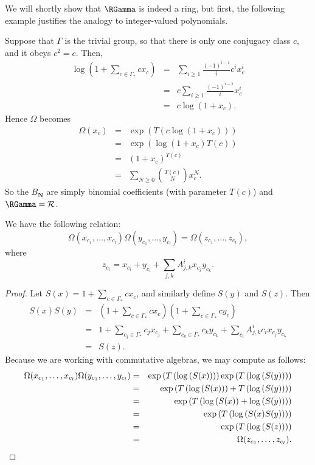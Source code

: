 We will shortly show that $\RGamma$ is indeed a ring, but first, the following example justifies the analogy to integer-valued polynomials.
\begin{example} \label{trivial_rg_example}
Suppose that $\Gamma$ is the trivial group, so that there is only one conjugacy class $c$, and it obeys $c^2 = c$. Then,
\begin{eqnarray*}
\log\left(1 + \sum_{c \in \Gamma_*} c x_c\right) &=& 
\sum_{i\geq 1} \frac{(-1)^{i-1}}{i} c^i x_c^i \\
&=& c \sum_{i\geq 1} \frac{(-1)^{i-1}}{i} x_c^i \\
&=& c \log(1+x_c).
\end{eqnarray*}
Hence $\Omega$ becomes
\begin{eqnarray*}
\Omega(x_{c}) &=& \exp(T(c \log(1+x_c))) \\
&=& \exp(\log(1+x_c) T(c)) \\
&=& (1+x_c)^{T(c)} \\
&=& \sum_{N \geq 0} \binom{T(c)}{N} x_c^N.
\end{eqnarray*}
So the $B_{\mathbf{N}}$ are simply binomial coefficients (with parameter $T(c)$) and $\RGamma = \mathcal{R}$.
\end{example}

\begin{proposition} \label{theta_product_prop}
We have the following relation:
\[
\Omega(x_{c_1}, \ldots, x_{c_l}) \Omega(y_{c_1}, \ldots, y_{c_l}) = \Omega(z_{c_1}, \ldots, z_{c_l}),
\]
where
\[
z_{c_i} = x_{c_i} + y_{c_i} + \sum_{j,k}A_{j,k}^{i}x_{c_j} y_{c_k}.
\]
\end{proposition}
\begin{proof}
Let $S(x) = 1 + \sum_{c \in \Gamma_*} c x_c$, and similarly define $S(y)$ and $S(z)$. Then
\begin{eqnarray*}
S(x)S(y) &=& \left(1 + \sum_{c \in \Gamma_*} c x_c\right)\left(1 + \sum_{c \in \Gamma_*} c y_c\right) \\
&=& 1 + \sum_{c_j \in \Gamma_*} c_j x_{c_j} + \sum_{c_k \in \Gamma_*} c_k y_{c_k} + \sum_{c_i} A_{j,k}^i c_i x_{c_j}y_{c_k} \\
&=& S(z).
\end{eqnarray*}
Because we are working with commutative algebras, we may compute as follows:
\begin{eqnarray*}
\Omega(x_{c_1}, \ldots, x_{c_l}) \Omega(y_{c_1}, \ldots, y_{c_l})
&=& \exp\left(T\left(\log\left(S(x)\right)\right)\right) \exp\left(T\left(\log\left(S(y)\right)\right)\right) \\
&=& \exp\left(T\left(\log\left(S(x)\right)\right) + T\left(\log\left(S(y)\right)\right)\right) \\
&=&\exp\left(T\left(\log\left(S(x)\right)+\log\left(S(y)\right)\right)\right) \\
&=&\exp\left(T\left(\log\left(S(x)S(y)\right)\right)\right) \\
&=&\exp\left(T\left(\log\left(S(z)\right)\right)\right) \\
&=& \Omega(z_{c_1}, \ldots, z_{c_l}).\qedhere
\end{eqnarray*}
\end{proof}

